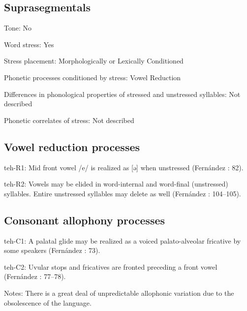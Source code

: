 {\subsection*{Suprasegmentals}
\begin{appendixdesc}
\item[Tone:] No

\item[Word stress:] Yes

\item[Stress placement:] Morphologically or Lexically Conditioned

\item[Phonetic processes conditioned by stress:] Vowel Reduction

\item[Differences in phonological properties of stressed and unstressed syllables:] Not described

\item[Phonetic correlates of stress:] Not described
\end{appendixdesc}
\subsection*{Vowel reduction processes}
\begin{appendixdesc}

\item[teh-R1:] Mid front vowel /e/ is realized as [ə] when unstressed (Fernández \citealt{Garay1998}: 82).

\item[teh-R2:] Vowels may be elided in word-internal and word-final (unstressed) syllables. Entire unstressed syllables may delete as well (Fernández \citealt{Garay1998}: 104--105).
\end{appendixdesc}
\subsection*{Consonant allophony processes}
\begin{appendixdesc}

\item[teh-C1:] A palatal glide may be realized as a voiced palato-alveolar fricative by some speakers (Fernández \citealt{Garay1998}: 73).

\item[teh-C2:] Uvular stops and fricatives are fronted preceding a front vowel (Fernández \citealt{Garay1998}: 77--78).

\item[Notes:] There is a great deal of unpredictable allophonic variation due to the obsolescence of the language.
\end{appendixdesc}
}
